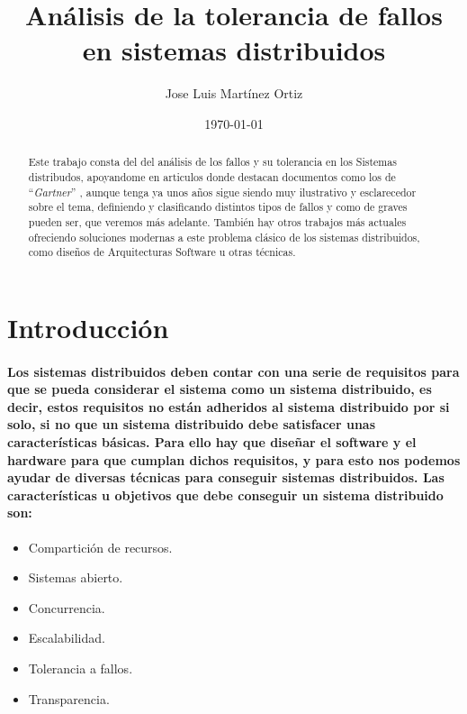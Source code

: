 \documentclass{./llncs2e/llncs}
\title{An\'{a}lisis de la tolerancia de fallos en sistemas distribuidos}
\author{Jose Luis Mart\'{i}nez Ortiz}
\institute{Universidad de Granada
\and Escuela T\'{e}cnica Superior de Ingenier\'{i}a Informática y Telecomunicaci\'{o}n}
\date{\normalsize\today} %
\begin{document}
\maketitle
\newpage

\begin{abstract}
Este trabajo consta del del an\'{a}lisis de los fallos y su tolerancia en los Sistemas distribudos, apoyandome en articulos donde destacan documentos como los de ``\textit{Gartner}'' \cite{Gartner},
aunque tenga ya unos años sigue siendo muy ilustrativo y esclarecedor sobre el tema, definiendo y clasificando distintos tipos de fallos y como de graves pueden ser, que veremos m\'{a}s adelante. Tambi\'{e}n hay otros trabajos más actuales ofreciendo soluciones modernas a este problema cl\'{a}sico de los sistemas distribuidos, como diseños de Arquitecturas Software u otras t\'{e}cnicas. 

\end{abstract}

\section{Introducción}
\paragraph{
Los sistemas distribuidos deben contar con una serie de requisitos para que se pueda
considerar el sistema como un sistema distribuido, es decir, estos requisitos no est\'{a}n adheridos al sistema distribuido por si solo, si no que un sistema distribuido debe 
satisfacer unas características b\'{a}sicas. Para ello hay que diseñar el software y
el hardware para que cumplan dichos requisitos, y para esto nos podemos ayudar de diversas 
t\'{e}cnicas para conseguir sistemas distribuidos.
Las características u objetivos que debe conseguir un sistema distribuido son:}
\begin{itemize}
\item Compartici\'{o}n de recursos.
\item Sistemas abierto.
\item Concurrencia.
\item Escalabilidad.
\item Tolerancia a fallos.
\item Transparencia.
\end{itemize}
\end{document}
